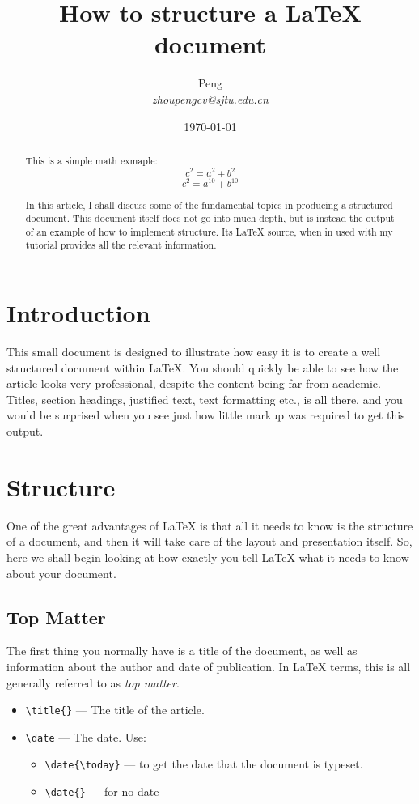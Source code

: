 \documentclass{article}
\begin{document}
\title{How to structure a \LaTeX{} document}
\author{Peng\\
\emph{zhoupengcv@sjtu.edu.cn}}
\date{\today}
\maketitle{}
\begin{abstract}

This is a simple math exmaple: $$c^2=a^2+b^2$$
\begin{equation}
  \label{eq:1}
  c^2=a^{10} + b^{10}
\end{equation}

   In this article, I shall discuss some of the fundamental topics in
 producing a structured document.  This document itself does not go into
 much depth, but is instead the output of an example of how to implement
 structure. Its \LaTeX{} source, when in used with my tutorial
 provides all the relevant information.
\end{abstract}

\section{Introduction}
\label{sec:introduction}

This small document is designed to illustrate how easy it is to create a well structured
document within \LaTeX\cite{lamport94}.  You should quickly be able to see how the article
looks very professional, despite the content being far from academic.  Titles, section
headings, justified text, text formatting etc., is all there, and you would be surprised
when you see just how little markup was required to get this output.

\section{Structure}
\label{sec:structure}

One of the great advantages of \LaTeX{} is that all it needs to know is
the structure of a document, and then it will take care of the layout
and presentation itself.  So, here we shall begin looking at how exactly
you tell \LaTeX{} what it needs to know about your document.

\subsection{Top Matter}
\label{sec:top-matter}

The first thing you normally have is a title of the document, as well as
information about the author and date of publication.  In \LaTeX{} terms,
this is all generally referred to as \emph{top matter}.
\begin{itemize}
\item \verb|\title{}| --- The title of the article.
\item \verb|\date| --- The date. Use:
  \begin{itemize}
  \item \verb|\date{\today}| --- to get the date that the document is typeset.
  \item \verb|\date{}| --- for no date
  \end{itemize}
\end{itemize}
\end{document}
